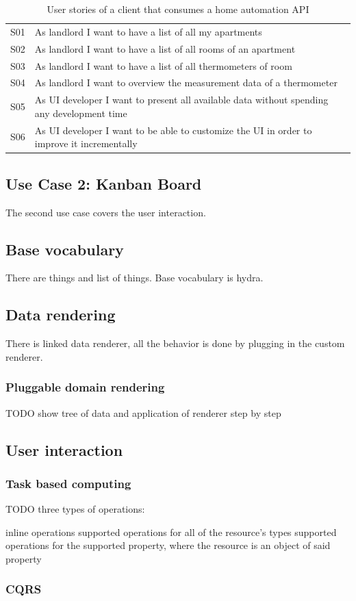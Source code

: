 \begin{table}
\begin{center}
\begin{tabular}{ |c|l| }
 \hline
 S01 & As landlord I want to have a list of all my apartments \\
 S02 & As landlord I want to have a list of all rooms of an apartment \\
 S03 & As landlord I want to have a list of all thermometers of room \\
 S04 & As landlord I want to overview the measurement data of a thermometer \\
 S05 & As UI developer I want to present all available data without spending any development time \\
 S06 & As UI developer I want to be able to customize the UI in order to improve it incrementally \\
 \hline
\end{tabular}
\caption{User stories of a client that consumes a home automation API}
\end{center}
\end{table}

\subsection{Use Case 2: Kanban Board}\label{usecases}
The second use case covers the user interaction.

\subsection{Base vocabulary}\label{basevocab}
There are things and list of things. Base vocabulary is hydra.

\subsection{Data rendering}\label{genericrendering}
There is linked data renderer, all the behavior is done by plugging in the custom renderer.

\subsubsection{Pluggable domain rendering}\label{domainrendering}
TODO show tree of data and application of renderer step by step

\subsection{User interaction}\label{interaction}

\subsubsection{Task based computing}\label{interaction}
TODO three types of operations:

inline operations
supported operations for all of the resource's types
supported operations for the supported property, where the resource is an object of said property

\subsubsection{CQRS}\label{interaction}
